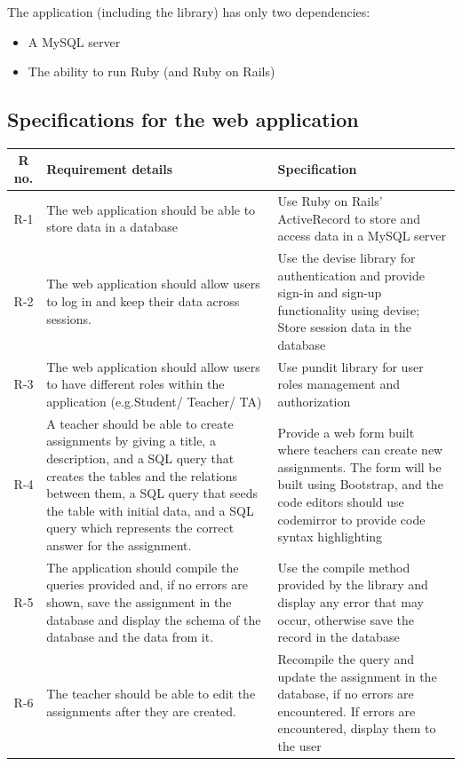 The application (including the library) has only two dependencies:
\begin{itemize}
  \item A MySQL server
  \item The ability to run Ruby (and Ruby on Rails)
\end{itemize}

\subsection{Specifications for the web application}

\begin{tabularx}{\textwidth}{|c|Y|Y|}
  \hline
  \textbf{R no.} & \textbf{Requirement details} & \textbf{Specification} \\\hline
  \endhead
  R-1 & The web application should be able to store data in a database & Use Ruby on Rails' ActiveRecord to store and access data in a MySQL server \\\hline
  R-2 & The web application should allow users to log in and keep their data across sessions. & Use the devise library for authentication and provide sign-in and sign-up functionality using devise; Store session data in the database \\\hline
  R-3 &  The web application should allow users to have different roles within the application (e.g.Student/ Teacher/ TA) & Use pundit library for user roles management and authorization\\\hline
  R-4 &  A teacher should be able to create assignments by giving a title, a description, and a SQL query that creates the tables and the relations between them, a SQL query that seeds the table with initial data, and a SQL query which represents the correct answer for the assignment. & Provide a web form built where teachers can create new assignments. The form will be built using Bootstrap, and the code editors should use codemirror to provide code syntax highlighting \\\hline
  R-5 &  The application should compile the queries provided and, if no errors are shown, save the assignment in the database and display the schema of the database and the data from it. & Use the compile method provided by the library and display any error that may occur, otherwise save the record in the database \\\hline
  R-6 & The teacher should be able to edit the assignments after they are created. & Recompile the query and update the assignment in the database, if no errors are encountered. If errors are encountered, display them to the user \\\hline

\end{tabularx}
